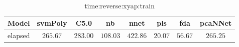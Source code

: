 \begin{table}[!ht]
	\centering
	\begin{tabular}{|c|c|c|c|c|c|c|c|}
		\hline
		Model & svmPoly & C5.0 & nb & nnet & pls & fda & pcaNNet \\ \hline
		elapsed & $265.67$ & $283.00$ & $108.03$ & $422.86$ & $20.07$ & $56.67$ & $265.25$ \\ \hline
	\end{tabular}
	\caption{time:reverse:xyap:train}
	\label{tab:time:reverse:xyap:train}
\end{table}
